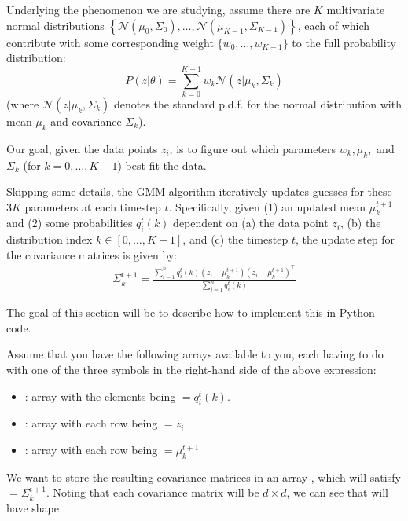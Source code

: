 Underlying the phenomenon we are studying, assume there are $K$ multivariate normal distributions $\left\{\mathcal{N}(\mu_0, \Sigma_0), \ldots, \mathcal{N}(\mu_{K-1}, \Sigma_{K-1})\right\}$, each of which contribute with some corresponding weight $\{w_0, \ldots, w_{K-1}\}$ to the full probability distribution:
$$P(z|\theta) = \sum_{k=0}^{K-1} w_k \mathcal{N}(z | \mu_k, \Sigma_k) $$
(where $\mathcal{N}(z | \mu_k, \Sigma_k) $ denotes the standard p.d.f. for the normal distribution with mean $\mu_k$  and covariance $ \Sigma_k $).

Our goal, given the data points $z_i$, is to figure out which parameters $w_k, \mu_k,$ and $\Sigma_k$ (for $k = 0, \ldots, K-1$) best fit the data.

Skipping some details, the GMM algorithm iteratively updates guesses for these $3K$ parameters at each timestep $t$.
Specifically, given (1) an updated mean $\mu_k^{t+1}$ and (2) some probabilities $q_i^t(k)$ dependent on (a) the data point $z_i$, (b) the distribution index $k \in [0, \ldots, K-1]$,  and (c) the timestep $t$, the update step for the covariance matrices is given by:
\begin{align*}
	\Sigma_k^{t+1} = \frac{\sum_{i=1}^{n} q_i^t(k) (z_i - \mu_k^{t+1}) (z_i - \mu_k^{t+1})^\top}{\sum_{i=1}^{n} q_i^t(k)}
\end{align*}

The goal of this section will be to describe how to implement this in Python code.

Assume that you have the following arrays available to you, each having to do with one of the three symbols in the right-hand side of the above expression:
\begin{itemize}
	\item {} :  array with the elements being  $ = q_i^t(k)$.

	\item {}:  array with each row being  $ = z_{i} $

	\item {}:  array with each row being  $= \mu_{k}^{t+1}$
\end{itemize}

We want to store the resulting covariance matrices in an array , which will satisfy  $= \Sigma_{k}^{t+1}$. Noting that each covariance matrix will be $d \times d$, we can see that  will have shape .

